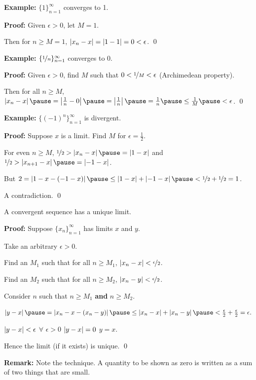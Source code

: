 \documentclass[10pt,aspectratio=169]{beamer}
\begin{document}
\begin{frame}
\textbf{Example:}
$\{ 1 \}_{n=1}^\infty$ converges to 1.  \pause 

\textbf{Proof:} Given $\epsilon > 0$, let $M=1$.

\pause
Then for $n \geq M=1$, \quad
$\left\lvert {x_n-x} \right\rvert = \left\lvert {1-1} \right\rvert = 0 < \epsilon$. \qed

\medskip
\pause

\textbf{Example:}
$\{ \nicefrac{1}{n} \}_{n=1}^\infty$ converges to 0.

\pause
\textbf{Proof:} Given $\epsilon > 0$, find $M$ such that
$0 < \nicefrac{1}{M} < \epsilon$ (Archimedean property).

\pause
Then for all $n \geq M$,
\quad
$\abs{x_n - x}
\pause
= \abs{\frac{1}{n} - 0}
\pause
= \abs{\frac{1}{n}}
\pause
= \frac{1}{n}
\pause
\leq \frac{1}{M}
\pause < \epsilon$. \qed

\medskip
\pause

\textbf{Example:}
$\{ {(-1)}^n \}_{n=1}^\infty$ is divergent.

\pause
\textbf{Proof:} Suppose $x$ is a limit.  Find $M$ for $\epsilon = \frac{1}{2}$.

\pause
For even $n \geq M$,
\quad
$\nicefrac{1}{2} > \abs{x_n - x} \pause  = \abs{1 - x}$
\pause
\quad  and \quad 
$\nicefrac{1}{2} > \abs{x_{n+1} - x} \pause  = \abs{-1 - x}$.

\pause
But
\quad
$2 = \abs{1 - x - (-1 -x)} \pause \leq \abs{1 - x} + \abs{-1 -x} \pause <
\nicefrac{1}{2} + \nicefrac{1}{2} = 1$.

\pause
A contradiction. \qed
\end{frame}

\begin{frame}

\begin{proposition}
A convergent sequence has a unique limit.
\end{proposition}

\pause

\textbf{Proof:}
Suppose $\{ x_n \}_{n=1}^\infty$ has limits $x$ and $y$.

\pause
Take an arbitrary $\epsilon > 0$.

\pause
Find an $M_1$ such that for all $n \geq M_1$,
\quad
$\left\lvert {x_n-x} \right\rvert < \nicefrac{\epsilon}{2}$.


\pause
Find an $M_2$ such that for all $n \geq M_2$,
\quad
$\left\lvert {x_n-y} \right\rvert < \nicefrac{\epsilon}{2}$.

\pause
Consider $n$ such that $n \geq M_1$ \textbf{and} $n \geq M_2$.

\pause
$
\abs{y-x}
\pause =
\abs{x_n-x - (x_n -y)}
\pause \leq
\abs{x_n-x} + \abs{x_n -y}
\pause <
\frac{\epsilon}{2} + \frac{\epsilon}{2} = \epsilon .
$

\pause
$\left\lvert {y-x} \right\rvert < \epsilon$ $\forall$  $\epsilon > 0$ \wthus $\left\lvert {y-x} \right\rvert = 0$
\pause
\wthus $y=x$.

\pause
Hence the limit (if it exists) is unique.
\qed

\medskip
\pause

\textbf{Remark:} Note the technique.  A quantity to be shown as zero is
written as a sum of two things that are small.
\end{frame}
\end{document}
